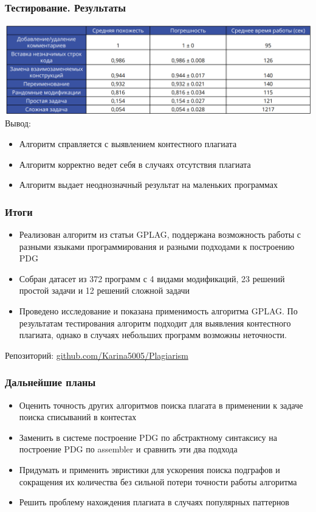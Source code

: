 \documentclass[10pt]{beamer}
\begin{document}
\begin{frame}\frametitle{Тестирование. Результаты}
	\hspace*{-0.6cm}
	\includegraphics[scale=0.6]{res0.png}
	\hspace*{-0.6cm}
	Вывод: 
	\begin{itemize}
		\item Алгоритм справляется с выявлением контестного плагиата
		\item Алгоритм корректно ведет себя в случаях отсутствия плагиата
		\item Алгоритм выдает неоднозначный результат на маленьких программах
	\end{itemize}
	
\end{frame}


\begin{frame}\frametitle{Итоги}
	\begin{itemize}
		\item Реализован алгоритм из статьи GPLAG, поддержана возможность работы с разными языками программирования и разными подходами к построению PDG
		\item Собран датасет из 372 программ с 4 видами модификаций, 23 решений простой задачи и 12 решений сложной задачи
		\item Проведено исследование и показана применимость алгоритма GPLAG. По результатам тестирования алгоритм подходит для выявления контестного плагиата, однако в случаях небольших программ возможны неточности.
		\newline
	\end{itemize}

    Репозиторий: \href{https://github.com/Karina5005/Plagiarism}{\color{blue}github.com/Karina5005/Plagiarism}
\end{frame}

\begin{frame}\frametitle{Дальнейшие планы}
    \begin{itemize}
    	\item Оценить точность других алгоритмов поиска плагата в применении к задаче поиска списываний в контестах
        \item Заменить в системе построение PDG по абстрактному синтаксису на построение PDG по assembler и сравнить эти два подхода
        \item Придумать и применить эвристики для ускорения поиска подграфов и сокращения их количества без сильной потери точности работы алгоритма
        \item Решить проблему нахождения плагиата в случаях популярных паттернов
        
    \end{itemize}
\end{frame}
\end{document}

